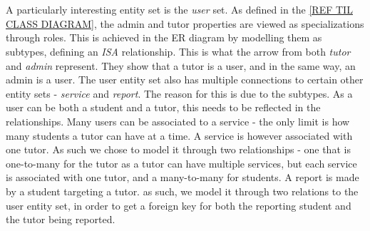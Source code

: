 \\\\
A particularly interesting entity set is the \textit{user} set. 
As defined in the \autoref{REF TIL CLASS DIAGRAM}, the admin and tutor properties are viewed as specializations through roles.
This is achieved in the ER diagram by modelling them as subtypes, defining an \textit{ISA} relationship.
This is what the arrow from both \textit{tutor} and \textit{admin} represent.
They show that a tutor is a user, and in the same way, an admin is a user.
The user entity set also has multiple connections to certain other entity sets - \textit{service} and \textit{report}.
The reason for this is due to the subtypes. 
As a user can be both a student and a tutor, this needs to be reflected in the relationships.
Many users can be associated to a service - the only limit is how many students a tutor can have at a time.
A service is however associated with one tutor.
As such we chose to model it through two relationships - one that is one-to-many for the tutor as a tutor can have multiple services, but each service is associated with one tutor, and a many-to-many for students.
A report is made by a student targeting a tutor. 
as such, we model it through two relations to the user entity set, in order to get a foreign key for both the reporting student and the tutor being reported.


